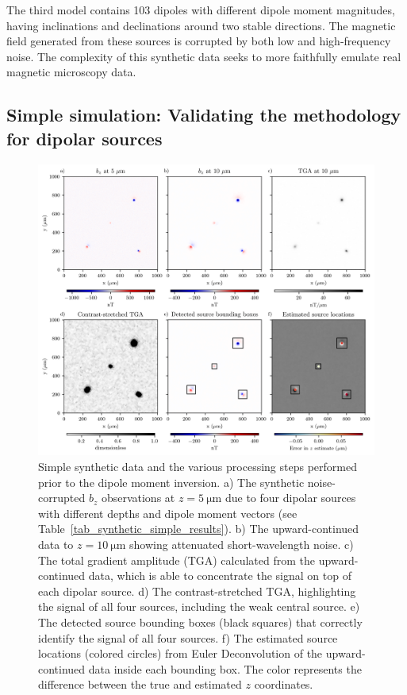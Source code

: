 The third model contains 103 dipoles with different dipole moment magnitudes, having inclinations and declinations around two stable directions.
The magnetic field generated from these sources is corrupted by both low and high-frequency noise.
The complexity of this synthetic data seeks to more faithfully emulate real magnetic microscopy data.


\subsection{Simple simulation: Validating the methodology for dipolar sources}

\begin{figure}[tb!]
  \centering
  \includegraphics[width=1\linewidth]{figures/simple-synthetic-data.png}
  \caption{
    Simple synthetic data and the various processing steps performed prior to the dipole moment inversion.
    a) The synthetic noise-corrupted $b_z$ observations at
    $z = \qty{5}{\micro\meter}$ due to four dipolar sources with different
    depths and dipole moment vectors
    (see Table~\ref{tab_synthetic_simple_results}).
    b) The upward-continued data to $z = \qty{10}{\micro\meter}$ showing
    attenuated short-wavelength noise.
    c) The total gradient amplitude (TGA) calculated from the
    upward-continued data, which is able to concentrate the signal on top
    of each dipolar source.
    d) The contrast-stretched TGA, highlighting the signal of all four
    sources, including the weak central source.
    e) The detected source bounding boxes (black squares) that correctly
    identify the signal of all four sources.
    f) The estimated source locations (colored circles) from Euler
    Deconvolution of the upward-continued data inside each bounding box.
    The color represents the difference between the true and estimated
    $z$ coordinates.
  }
  \label{fig_synthetic_simple_data}
\end{figure}

